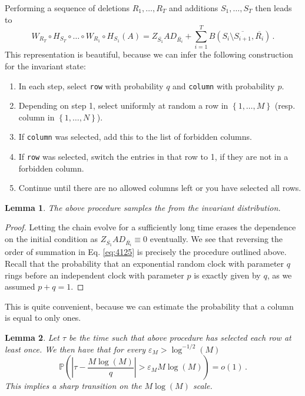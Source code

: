 \documentclass{article}
\numberwithin{equation}{section}
\newcommand{\gk}[1]{\left\{#1\right\}}
\newcommand{\rk}[1]{\left(#1\right)}
\newcommand{\abs}[1]{\left| #1 \right|}
\renewcommand{\P}   {\mathbb{P}}
\newcommand{\e}{\varepsilon}
\newcommand{\1}{\mathbbm{1}}
\renewcommand{\P}{\mathbb{P}}
\newtheorem{lemma}{Lemma}[section]
\begin{document}
Performing a sequence of deletions $R_1,\ldots,R_T$ and additions $S_1,\ldots,S_T$ then leads to
\begin{equation}\label{eq:4125}
    W_{R_T}\circ H_{S_T}\circ\ldots\circ W_{R_1}\circ H_{S_1}(A)=Z_{\overline{S_1}}AD_{\overline{R_i}}+\sum_{i=1}^T B\rk{S_i\setminus\overline{S_{i+1}},\overline{R_i}}\, .
\end{equation}
This representation is beautiful, because we can infer the following construction for the invariant state:
\begin{enumerate}
    \item In each step, select \texttt{row} with probability $q$ and \texttt{column} with probability $p$.
    \item Depending on step 1, select uniformly at random a row in $\gk{1,\ldots, M}$ (resp. column in $\gk{1,\ldots, N}$).
    \item If \texttt{column} was selected, add this to the list of forbidden columns.
    \item If \texttt{row} was selected, switch the entries in that row to 1, if they are not in a forbidden column.
    \item Continue until there are no allowed columns left or you have selected all rows.
\end{enumerate}
\begin{lemma}\label{lem:invDist}
    The above procedure samples the from the invariant distribution.
\end{lemma}
\begin{proof}
    Letting the chain evolve for a sufficiently long time erases the dependence on the initial condition as $Z_{\overline{S_1}}AD_{\overline{R_i}}\equiv 0$ eventually. We see that reversing the order of summation in Eq. \eqref{eq:4125} is precisely the procedure outlined above. Recall that the probability that an exponential random clock with parameter $q$ rings before an independent clock with parameter $p$ is exactly given by $q$, as we assumed $p+q=1$.
\end{proof}
This is quite convenient, because we can estimate the probability that a column is equal to only ones.
\begin{lemma}
    Let $\tau$ be the time such that above procedure has selected each row at least once. We then have that for every $\e_M>\log^{-1/2}(M)$
    \begin{equation}
        \P\rk{\abs{\tau-\frac{M\log(M)}{q}}>\e_MM\log(M)}=o(1)\, .
    \end{equation}
    This implies a sharp transition on the $M\log(M)$ scale.
\end{lemma}
\end{document}
